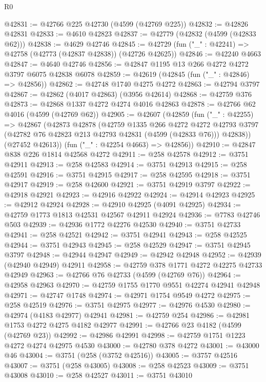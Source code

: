 \begin{lexlean}{R0}
\begin{coremodule}
@42831 := @42766 @225 @42730 (@4599 (@42769 @225))
@42832 := @42826 @42831
@42833 := @4610 @42823
@42837 := @42779 (@42832 (@4599 (@42833 @62)))
@42838 := @4629 @42746
@42845 := @42729 (fun ("_" : @42241) => @42758 (@42773 (@42837 @42838)) (@42726 @42625))
@42846 := @42240 @4663
@42847 := @4640 @42746
@42856 := @42847 @1195 @13 @266 @4272 @4272 @3797 @6075 @42838 @6078
@42859 := @42619 (@42845 (fun ("_" : @42846) => @42856))
@42862 := @42748 @1740 @4275 @4272
@42863 := @42794 @3797
@42867 := @42862 (@4017 @42863) (@3956 @42614)
@42868 := @42759 @376
@42873 := @42868 @1337 @4272 @4274 @4016 @42863
@42878 := @42766 @62 @4016 (@4599 (@42769 @62))
@42905 := @42607
    (@42859
      (fun ("_" : @42255) =>
      @42867
        (@42873
          @42878
          (@42759
            @1335
            @266
            @4272
            @4272
            @42793
            @3797
            (@42782 @76 @42823 @213 @42793 @42831 (@4599 (@42833 @76)))
            @42838))
        (@27452 @42613))
      (fun ("_" : @42254 @4663) => @42856))
@42910 := @42847 @838 @226 @1814 @42568 @4272
@42911 := @258 @42578
@42912 := @3751 @42911
@42913 := @258 @42583
@42914 := @3751 @42913
@42915 := @258 @42591
@42916 := @3751 @42915
@42917 := @258 @42595
@42918 := @3751 @42917
@42919 := @258 @42600
@42921 := @3751 @42919 @3797
@42922 := @42918 @42921
@42923 := @42916 @42922
@42924 := @42914 @42923
@42925 := @42912 @42924
@42928 := @42910 @42925 (@4091 @42925)
@42934 := @42759 @1773 @1813 @42531 @42567 @42911 @42924
@42936 := @7783 @42746 @503
@42939 := @42936 @1772 @42276 @42530
@42940 := @3751 @42733
@42941 := @258 @42521
@42942 := @3751 @42941
@42943 := @258 @42525
@42944 := @3751 @42943
@42945 := @258 @42529
@42947 := @3751 @42945 @3797
@42948 := @42944 @42947
@42949 := @42942 @42948
@42952 := @42939 (@42940 @42949) @42911
@42958 := @42759 @378 @1771 @4272 @42275 @42733 @42949
@42963 := @42766 @76 @42733 (@4599 (@42769 @76))
@42964 := @42958 @42963
@42970 := @42759 @1755 @1770 @9551 @42274 @42941 @42948
@42971 := @42747 @1748
@42974 := @42971 @1754 @9549 @4272
@42975 := @258 @42519
@42976 := @3751 @42975
@42977 := @42976 @4530
@42980 := @42974 (@4183 @42977) @42941
@42981 := @42759 @254
@42986 := @42981 @1753 @4272 @4275 @4182 @42977
@42991 := @42766 @23 @4182 (@4599 (@42769 @23))
@42992 := @42986 @42991
@42998 := @42759 @1751 @1223 @4272 @4274 @42975 @4530
@43000 := @42780 @378 @4272
@43001 := @43000 @46
@43004 := @3751 (@258 (@3752 @42516))
@43005 := @3757 @42516
@43007 := @3751 (@258 @43005)
@43008 := @258 @42523
@43009 := @3751 @43008
@43010 := @258 @42527
@43011 := @3751 @43010

\end{coremodule}
\end{lexlean}
